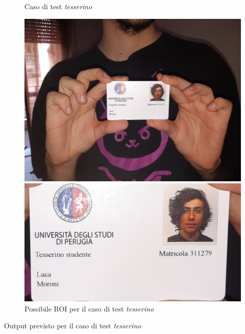\documentclass[12pt,a4paper]{article}
\begin{document}
\begin{figure}[H]
    \begin{minipage}{0.48\textwidth}
        \centering
        \caption{Caso di test \textit{tesserino}}
        \includegraphics[width=\textwidth]{test_tesserino.jpg}
    \end{minipage}\hfill
    \begin{minipage}{0.48\textwidth}
        \centering
        \caption{Possibile ROI per il caso di test \textit{tesserino}}
        \includegraphics[width=\textwidth]{test_tesserino_snapshot.jpg}
    \end{minipage}
\end{figure}

\begin{listing}[H]
    \caption{Output previsto per il caso di test \textit{tesserino}}
    \inputminted{python}{test_tesserino.py}
\end{listing}
\end{document}
